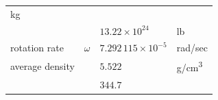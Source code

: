 \documentclass[
]{book}
\begin{document}
\begin{longtable}[]{@{}llll@{}}
\begin{minipage}[t]{0.05\columnwidth}
kg\strut
\end{minipage}\tabularnewline
\begin{minipage}[t]{0.34\columnwidth}\raggedright
\strut
\end{minipage} & \begin{minipage}[t]{0.06\columnwidth}\raggedright
\strut
\end{minipage} & \begin{minipage}[t]{0.44\columnwidth}\raggedright
\(13.22 \times 10^{24}\)\strut
\end{minipage} & \begin{minipage}[t]{0.05\columnwidth}\raggedright
lb\strut
\end{minipage}\tabularnewline
\begin{minipage}[t]{0.34\columnwidth}\raggedright
rotation rate\strut
\end{minipage} & \begin{minipage}[t]{0.06\columnwidth}\raggedright
\(\omega\)\strut
\end{minipage} & \begin{minipage}[t]{0.44\columnwidth}\raggedright
\(7.292\,115 \times 10^{−5}\)\strut
\end{minipage} & \begin{minipage}[t]{0.05\columnwidth}\raggedright
rad/sec\strut
\end{minipage}\tabularnewline
\begin{minipage}[t]{0.34\columnwidth}\raggedright
average density\strut
\end{minipage} & \begin{minipage}[t]{0.06\columnwidth}\raggedright
\strut
\end{minipage} & \begin{minipage}[t]{0.44\columnwidth}\raggedright
\(5.522\)\strut
\end{minipage} & \begin{minipage}[t]{0.05\columnwidth}\raggedright
g/cm\textsuperscript{3}\strut
\end{minipage}\tabularnewline
\begin{minipage}[t]{0.34\columnwidth}\raggedright
\strut
\end{minipage} & \begin{minipage}[t]{0.06\columnwidth}\raggedright
\strut
\end{minipage} & \begin{minipage}[t]{0.44\columnwidth}\raggedright
\(344.7\)\strut
\end{minipage} & \begin{minipage}[t]{0.05\columnwidth}\raggedright

\end{minipage}
\end{longtable}
\end{document}
